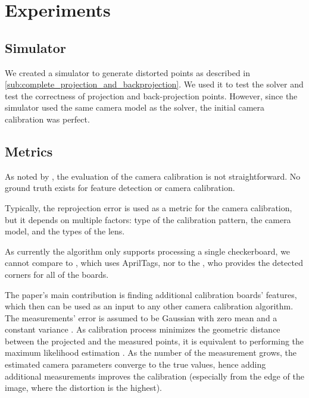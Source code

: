 \chapter{Experiments}\label{cha:experiments}

\section{Simulator}\label{sec:simulator}

We created a simulator to generate distorted points as described in
\cref{sub:complete_projection_and_backprojection}. We used it to test the
solver and test the correctness of projection and back-projection points.
However, since the simulator used the same camera model as the solver, the
initial camera calibration was perfect.

\section{Metrics}\label{sec:metrics}

As noted by \cite{duisterhofTartanCalibIterativeWideAngle2022}, the evaluation
of the camera calibration is not straightforward. No ground truth exists for
feature detection or camera calibration.

Typically, the reprojection error is used as a metric for the camera
calibration, but it depends on multiple factors: type of the calibration
pattern, the camera model, and the types of the lens.


As currently the algorithm only supports processing a single checkerboard, we
cannot compare to \cite{duisterhofTartanCalibIterativeWideAngle2022}, which uses
AprilTags, nor to the \cite{lochmanBabelCalibUniversalApproach2021}, who
provides the detected corners for all of the boards.

The paper's main contribution is finding additional calibration boards' features, which
then can be used as an input to any other camera calibration algorithm. The
measurements' error is assumed to be Gaussian with zero mean and a constant
variance \citep{hartleyMultipleViewGeometry2004}. As calibration process
minimizes the geometric distance between the projected and the measured points,
it is equivalent to performing the maximum likelihood estimation
\citep{hartleyMultipleViewGeometry2004}. As the number of the measurement grows,
the estimated camera parameters converge to the true values, hence adding
additional measurements improves the calibration (especially from the edge of
the image, where the distortion is the highest).

